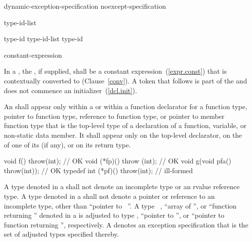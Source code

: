 \begin{bnf}
\br
    dynamic-exception-specification\br
    noexcept-specification
\end{bnf}

\begin{bnf}
\br
     type-id-list\opt \terminal{)}
\end{bnf}

\begin{bnf}
\br
    type-id \opt\br
    type-id-list \terminal{,} type-id \opt
\end{bnf}

\begin{bnf}
\br
     \terminal{(} constant-expression \terminal{)}\br
\end{bnf}

%
In a , the ,
if supplied, shall be a constant expression~(\ref{expr.const}) that is contextually
converted to  (Clause~\ref{conv}).
A \tcode{(} token that follows  is part of the
 and does not commence an
initializer~(\ref{dcl.init}).

\pnum
An
shall appear only within a 
or within a function declarator for a function type,
pointer to function type, reference to function type, or pointer to
member function type that is the top-level type of a declaration
of a function, variable, or non-static data member. It shall appear only
on the top-level declarator, on the  of one of its
 (if any), or on its return type.
\enterexample
\begin{codeblock}
void f() throw(int);                    // OK
void (*fp)() throw (int);               // OK
void g(void pfa() throw(int));          // OK
typedef int (*pf)() throw(int);         // ill-formed
\end{codeblock}

\exitexample

%
A type denoted
in a 
shall not denote an incomplete type or an rvalue reference type.
A type denoted
in a 
shall not denote a pointer or reference to an incomplete type, other than
``pointer to \cv\ ''.
A type
\cv\ ,
``array of '', or
``function returning ''
denoted in a 
is adjusted to type ,
``pointer to '', or ``pointer to function returning '', respectively.
A 
denotes an exception specification
that is the set of adjusted types specified thereby.

